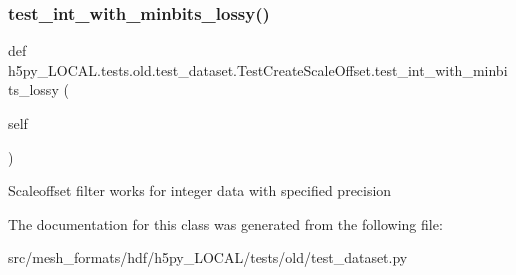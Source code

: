 \subsubsection{\texorpdfstring{test\+\_\+int\+\_\+with\+\_\+minbits\+\_\+lossy()}{test\_int\_with\_minbits\_lossy()}}
{\footnotesize\ttfamily def h5py\+\_\+\+L\+O\+C\+A\+L.\+tests.\+old.\+test\+\_\+dataset.\+Test\+Create\+Scale\+Offset.\+test\+\_\+int\+\_\+with\+\_\+minbits\+\_\+lossy (\begin{DoxyParamCaption}\item[{}]{self }\end{DoxyParamCaption})}

\begin{DoxyVerb}Scaleoffset filter works for integer data with specified precision \end{DoxyVerb}
 

The documentation for this class was generated from the following file\+:\begin{DoxyCompactItemize}
\item 
src/mesh\+\_\+formats/hdf/h5py\+\_\+\+L\+O\+C\+A\+L/tests/old/test\+\_\+dataset.\+py\end{DoxyCompactItemize}
